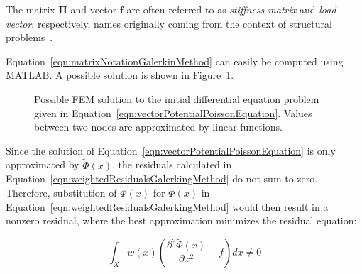 The matrix $\mathbf{\Pi}$ and vector $\mathbf{f}$ are often referred to as \emph{stiffness matrix} and \emph{load vector}, respectively, names originally coming from the context of structural problems~\cite{Ciarlet1978,Jin2014}. 

Equation~\ref{eqn:matrixNotationGalerkinMethod} can easily be computed using MATLAB. A possible solution is shown in Figure~\ref{fig:possibleFemSolution}. 

\begin{figure}[htb]
\centering
{}
\caption[FEM solution example]{Possible FEM solution to the initial differential equation problem given in Equation~\ref{eqn:vectorPotentialPoissonEquation}. Values between two nodes are approximated by linear functions.}%
\label{fig:possibleFemSolution}%
\end{figure}

Since the solution of Equation~\ref{eqn:vectorPotentialPoissonEquation} is only approximated by $\tilde{\Phi}(x)$, the residuals calculated in Equation~\ref{eqn:weightedResidualsGalerkingMethod} do not sum to zero. Therefore, substitution of $\tilde{\Phi}(x)$ for $\Phi(x)$ in Equation~\ref{eqn:weightedResidualsGalerkingMethod} would then result in a nonzero residual, where the best approximation minimizes the residual equation:

\begin{equation}
	\int_{X} w(x)\left(\frac{\partial^{2} \tilde{\Phi}(x)}{\partial x^{2}} - f \right) dx \neq 0
	\label{eqn:weightedResidualsGalerkingMethodNoneZero}
\end{equation}

